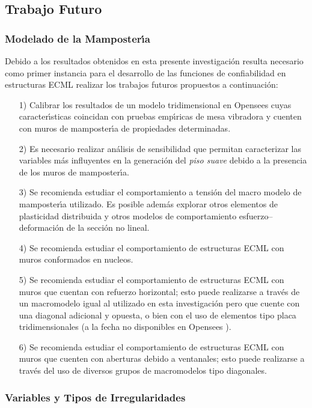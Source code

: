 \subsection{ Trabajo Futuro}

\subsubsection{Modelado de la Mamposter\'{\i}a}

Debido a los resultados obtenidos en esta presente investigaci\'on resulta necesario como primer instancia para el desarrollo de las funciones de confiabilidad en estructuras ECML realizar los trabajos futuros propuestos a continuaci\'on:

\begin{itemize}
	\item [1)] Calibrar los resultados de un modelo tridimensional en Opensees cuyas caracter\'{\i}sticas coincidan con pruebas emp\'{\i}ricas de mesa vibradora y cuenten con muros de mamposter\'{\i}a de propiedades determinadas.
	\item [2)] Es necesario realizar an\'alisis de sensibilidad \cite{SRT2004} que permitan caracterizar las variables m\'as influyentes en la generaci\'on del \emph{piso suave} debido a la presencia de los muros de mamposter\'{\i}a.
		\item [3)] Se recomienda estudiar el comportamiento a tensi\'on del macro modelo de mamposter\'{\i}a utilizado. Es posible adem\'as explorar otros elementos de plasticidad distribuida y otros modelos de comportamiento esfuerzo--deformaci\'on de la secci\'on no lineal.		
		\item [4)] Se recomienda estudiar el comportamiento de estructuras ECML con muros conformados en nucleos.		
		\item [5)] Se recomienda estudiar el comportamiento de estructuras ECML con muros que cuentan con refuerzo horizontal; esto puede realizarse a trav\'es de un macromodelo igual al utilizado en esta investigaci\'on pero que cuente con una diagonal adicional y opuesta, o bien con el uso de elementos tipo placa tridimensionales (a la fecha no disponibles en Opensees \cite{OP2006}).
		\item [6)] Se recomienda estudiar el comportamiento de estructuras ECML con muros que cuenten con aberturas debido a ventanales; esto puede realizarse a trav\'es del uso de diversos grupos de macromodelos tipo diagonales.
\end{itemize}

\subsubsection{Variables y Tipos de Irregularidades}

